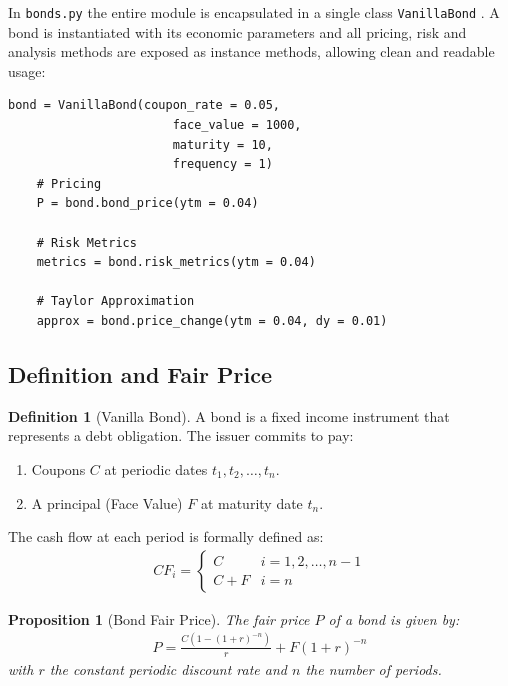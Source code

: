 \documentclass{article}
\theoremstyle{definition}  %
\newtheorem{definition}{Definition}[section]
\theoremstyle{plain}  %
\newtheorem{proposition}{Proposition}[section]
\numberwithin{definition}{section}
\numberwithin{proposition}{section}
\numberwithin{theorem}{section}
\numberwithin{equation}{section}
\begin{document}
In \color{magenta} \texttt{bonds.py} \color{black} the entire module is encapsulated in a single class \color{codegreen} \texttt{VanillaBond} \color{black}. A bond is instantiated with its economic parameters and all pricing, risk and analysis methods are exposed as instance methods, allowing clean and readable usage:

\begin{lstlisting}[style = Pythonstyle]
    bond = VanillaBond(coupon_rate = 0.05,
                       face_value = 1000,
                       maturity = 10,
                       frequency = 1)
    # Pricing
    P = bond.bond_price(ytm = 0.04)

    # Risk Metrics
    metrics = bond.risk_metrics(ytm = 0.04)

    # Taylor Approximation
    approx = bond.price_change(ytm = 0.04, dy = 0.01)
\end{lstlisting}

\subsection{Definition and Fair Price}
\label{subsec:bonddefinition}

\begin{definition}[Vanilla Bond]
    A bond is a fixed income instrument that represents a debt obligation. The issuer commits to pay:
    \begin{enumerate}
        \item Coupons $C$ at periodic dates $t_1, t_2, \dots, t_n$.
        \item A principal (Face Value) $F$ at maturity date $t_n$.
    \end{enumerate}
\end{definition}

The cash flow at each period is formally defined as:
\begin{align*}
    CF_{i} = 
    \begin{cases}
        C & i = 1, 2, \dots, n - 1 \\
        C + F & i = n
    \end{cases}
\end{align*}

\begin{proposition}[Bond Fair Price]
    The fair price $P$ of a bond is given by:
    \begin{align*}
        P = \frac{C(1 - (1 + r)^{-n})}{r} + F (1 + r)^{-n}
    \end{align*}
    with $r$ the constant periodic discount rate and $n$ the number of periods.
\end{proposition}
\end{document}
